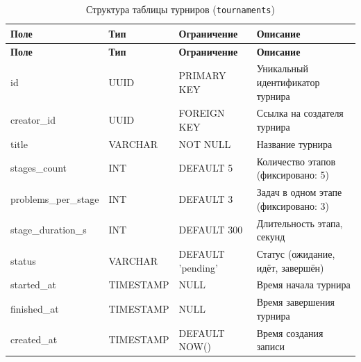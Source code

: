 \begin{longtable}{|l|l|p{3.5cm}|p{5.5cm}|}
	\caption{Структура таблицы турниров (\texttt{tournaments})} \label{tab:db_tournaments} \\

	\hline
	\textbf{Поле}    & \textbf{Тип} & \textbf{Ограничение} & \textbf{Описание}                        \\ \hline
	\endfirsthead

	\tabcont{\ref{tab:db_tournaments}}
	\textbf{Поле}    & \textbf{Тип} & \textbf{Ограничение} & \textbf{Описание}                        \\ \hline
	\endhead

	\hline
	\endfoot

	\hline
	\endlastfoot

	id               & UUID         & PRIMARY KEY          & Уникальный идентификатор турнира         \\ \hline
	creator\_id      & UUID         & FOREIGN KEY          & Ссылка на создателя турнира              \\ \hline
	title            & VARCHAR      & NOT NULL             & Название турнира                         \\ \hline
	stages\_count    & INT          & DEFAULT 5            & Количество этапов (фиксировано: 5)       \\ \hline
	problems\_per\_stage & INT      & DEFAULT 3            & Задач в одном этапе (фиксировано: 3)     \\ \hline
	stage\_duration\_s   & INT      & DEFAULT 300          & Длительность этапа, секунд               \\ \hline
	status           & VARCHAR      & DEFAULT 'pending'    & Статус (ожидание, идёт, завершён)        \\ \hline
	started\_at      & TIMESTAMP    & NULL                 & Время начала турнира                     \\ \hline
	finished\_at     & TIMESTAMP    & NULL                 & Время завершения турнира                 \\ \hline
	created\_at      & TIMESTAMP    & DEFAULT NOW()        & Время создания записи                    \\ \hline
\end{longtable}

